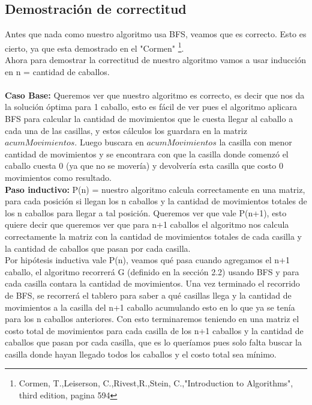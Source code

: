 \subsection{Demostraci\'on de correctitud} 

Antes que nada como nuestro algoritmo usa BFS, veamos que es correcto. Esto es cierto, ya que esta demostrado en el "Cormen" \footnote{Cormen, T.,Leiserson, C.,Rivest,R.,Stein, C.,"Introduction to Algorithms", third edition, pagina 594}. \\



Ahora para demostrar la correctitud de nuestro algoritmo vamos a usar inducción en n = cantidad de caballos. \\ \\

\textbf{Caso Base:} Queremos ver que nuestro algoritmo es correcto, es decir que nos da la solución óptima para 1 caballo, esto es fácil de ver pues el algoritmo aplicara BFS para calcular la cantidad de movimientos que le cuesta llegar al caballo a cada una de las casillas, y estos cálculos los guardara en la matriz $acumMovimientos$. Luego buscara en $acumMovimientos$ la casilla con menor cantidad de movimientos y se encontrara con que la casilla donde comenzó el caballo cuesta 0 (ya que no se movería) y devolvería esta casilla que costo 0 movimientos como resultado.\\

\textbf{Paso inductivo:} P(n) = nuestro algoritmo calcula correctamente en una matriz, para cada posición si llegan los n caballos y la cantidad de movimientos totales de los n caballos para llegar a tal posición.
Queremos ver que vale P(n+1), esto quiere decir que queremos ver que para n+1 caballos el algoritmo nos calcula correctamente la matriz con la cantidad de movimientos totales de cada casilla y la cantidad de caballos que pasan por cada casilla. \\

Por hipótesis inductiva vale P(n), veamos qué pasa cuando agregamos el n+1 caballo, el algoritmo recorrerá G (definido en la sección 2.2) usando BFS y para cada casilla contara la cantidad de movimientos. Una vez terminado el recorrido de BFS, se recorrerá el tablero para saber a qué casillas llega y la cantidad de movimientos a la casilla del n+1 caballo acumulando esto en lo que ya se tenía para los n caballos anteriores. Con esto terminaremos teniendo en una matriz el costo total de movimientos para cada casilla de los n+1 caballos y la cantidad de caballos que pasan por cada casilla, que es lo queríamos pues solo falta buscar la casilla donde hayan llegado todos los caballos y el costo total sea mínimo.






